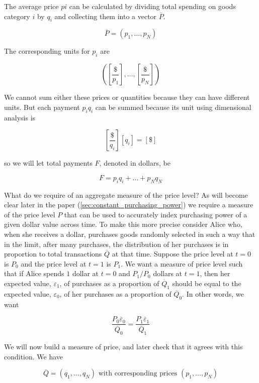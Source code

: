 The average price $pi$ can be calculated by dividing total spending on goods category $i$ by $q_i$
and collecting them into a vector $\overline P$.

\begin{equation}
    \overline P = \left( p_1, \dots, p_N \right)
\end{equation}

The corresponding units for $p_i$ are

\[ \left( \left[ \frac {\$} {p_1} \right], \dots, \left[ \frac {\$} {p_N} \right] \right) \]

We cannot sum either these prices or quantities because they can have different units. But each
payment $p_i q_i$ can be summed because its unit using dimensional analysis is

\[ \left[ \frac {\$} {q_i} \right] \left[ q_i \right] = \left[ \$ \right] \]

so we will let total payments $F$, denoted in dollars, be

\[ F = p_i q_i + \dots + p_N q_N \]

What do we require of an aggregate measure of the price level? As will become clear later in the
paper (\ref{sec:constant_purchasing_power}) we require a measure of the price level $P$ that can be
used to accurately index purchasing power of a given dollar value across time. To make this more
precise consider Alice who, when she receives a dollar, purchases goods randomly selected in such a
way that in the limit, after many purchases, the distribution of her purchases is in proportion to
total transactions $\overline Q$ at that time. Suppose the price level at $t=0$ is $P_0$ and the
price level at $t=1$ is $P_1$. We want a measure of price level such that if Alice spends $1$ dollar
at $t=0$ and $P_1 / P_0$ dollars at $t=1$, then her expected value, $\varepsilon_1$, of purchases as
a proportion of $\overline Q_1$ should be equal to the expected value, $\varepsilon_0$, of her
purchases as a proportion of $\overline Q_0$. In other words, we want

\begin{equation}
    \frac {P_0 \overline \varepsilon_0} {\overline Q_0} = \frac {P_1 \overline \varepsilon_1} {\overline Q_1}
\end{equation}

We will now build a measure of price, and later check that it agrees with this condition. We have

\[
    \overline Q = \left( q_1, \dots, q_N \right) \textrm{ with corresponding prices } \left( p_1, \dots, p_N \right)
\]

